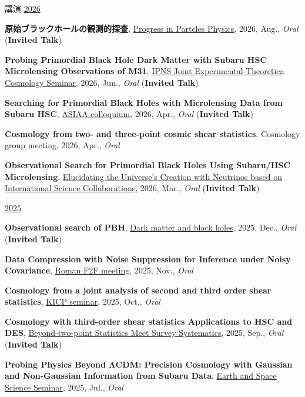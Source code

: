 \begin{rSection}{講演}
\underline{2026}
\begin{etaremune}
\setcounter{enumi}{52}
\item \textbf{原始ブラックホールの観測的探査}, \href{https://indico.yukawa.kyoto-u.ac.jp/event/95/overview}{Progress in Partcles Physics}, 2026, Aug., \textit{Oral} (\textbf{Invited Talk})
\item \textbf{Probing Primordial Black Hole Dark Matter with Subaru HSC Microlensing Observations of M31}, \href{https://cosmophysics.gitlab.io/jointseminar.gitlab.io/sugiyama20260615.html}{IPNS Joint Experimental-Theoretica Cosmology Seminar}, 2026, Jun., \textit{Oral} (\textbf{Invited Talk})
\item \textbf{Searching for Primordial Black Holes with Microlensing Data from Subaru HSC}, \href{https://www.asiaa.sinica.edu.tw/activity/colloquium.php}{ASIAA colloquium}, 2026, Apr., \textit{Oral} (\textbf{Invited Talk})
\item \textbf{Cosmology from two- and three-point cosmic shear statistics}, Cosmology group meeting, 2026, Apr., \textit{Oral}
\item \textbf{Observational Search for Primordial Black Holes Using Subaru/HSC Microlensing}, \href{https://www-kam2.icrr.u-tokyo.ac.jp/event/19/}{Elucidating the Universe's Creation with Neutrinos based on International Science Collaborations}, 2026, Mar., \textit{Oral} (\textbf{Invited Talk})
\end{etaremune}

\underline{2025}
\begin{etaremune}
\setcounter{enumi}{47}
\item \textbf{Observational search of PBH}, \href{https://indico.ipmu.jp/event/464/timetable/#20251205}{Dark matter and black holes}, 2025, Dec., \textit{Oral} (\textbf{Invited Talk})
\item \textbf{Data Compression with Noise Suppression 
for Inference under Noisy Covariance}, \href{https://roman-hlis-cosmology.caltech.edu/news/2024-f2f}{Roman F2F meeting}, 2025, Nov., \textit{Oral}
\item \textbf{Cosmology from a joint analysis of second and third order shear statistics}, \href{https://astrophysics.uchicago.edu/events/event/2530/?past=y}{KICP seminar}, 2025, Oct., \textit{Oral}
\item \textbf{Cosmology with third-order shear statistics Applications to HSC and DES}, \href{https://indico.ipmu.jp/event/460/overview}{Beyond-two-point Statistics Meet Survey Systematics}, 2025, Sep., \textit{Oral} (\textbf{Invited Talk})
\item \textbf{Probing Physics Beyond ΛCDM: Precision Cosmology with Gaussian and Non-Gaussian Information from Subaru Data}, \href{https://www.ess.sci.osaka-u.ac.jp/researchers/seminar.html}{Earth and Space Science Seminar}, 2025, Jul., \textit{Oral}
\end{etaremune}


\end{rSection}

